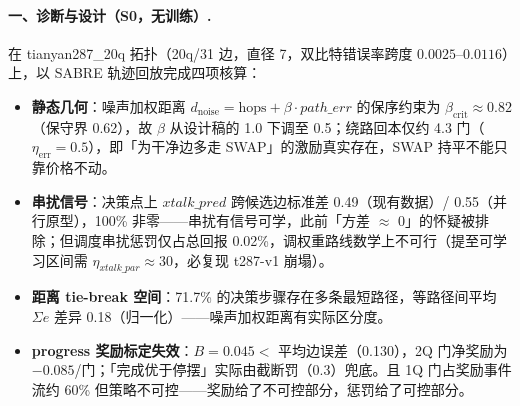 \paragraph{一、诊断与设计（S0，无训练）.}
在 tianyan287\_20q 拓扑（20q/31 边，直径 7，双比特错误率跨度 $0.0025$--$0.0116$）上，以 SABRE 轨迹回放完成四项核算：
\begin{itemize}
    \item \textbf{静态几何}：噪声加权距离 $d_{\mathrm{noise}}=\mathrm{hops}+\beta\cdot path\_err$ 的保序约束为 $\beta_{\mathrm{crit}}\approx0.82$（保守界 0.62），故 $\beta$ 从设计稿的 1.0 下调至 0.5；绕路回本仅约 4.3 门（$\eta_{\mathrm{err}}=0.5$），即「为干净边多走 SWAP」的激励真实存在，SWAP 持平不能只靠价格不动。
    \item \textbf{串扰信号}：决策点上 $xtalk\_pred$ 跨候选边标准差 0.49（现有数据）/ 0.55（并行原型），100\% 非零——串扰有信号可学，此前「方差 $\approx$ 0」的怀疑被排除；但调度串扰惩罚仅占总回报 0.02\%，调权重路线数学上不可行（提至可学习区间需 $\eta_{xtalk\_par}\approx30$，必复现 t287-v1 崩塌）。
    \item \textbf{距离 tie-break 空间}：71.7\% 的决策步骤存在多条最短路径，等路径间平均 $\Sigma e$ 差异 0.18（归一化）——噪声加权距离有实际区分度。
    \item \textbf{progress 奖励标定失效}：$B=0.045 <$ 平均边误差（0.130），2Q 门净奖励为 $-0.085$/门；「完成优于停摆」实际由截断罚（0.3）兜底。且 1Q 门占奖励事件流约 60\% 但策略不可控——奖励给了不可控部分，惩罚给了可控部分。
\end{itemize}

